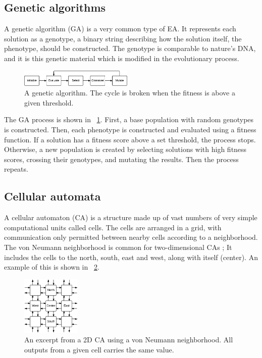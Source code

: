
\subsection{Genetic algorithms}

A genetic algorithm (GA) is a very common type of EA.
It represents each solution as a genotype, a binary string describing how the solution itself, the phenotype, should be constructed.
The genotype is comparable to nature's DNA, and it is this genetic material which is modified in the evolutionary process.

\begin{figure}[!ht]
    \centering
    \includegraphics[width=0.48\textwidth]{figures/ga}
    \caption{A genetic algorithm. The cycle is broken when the fitness is above a given threshold.}
    \label{fig:ga}
\end{figure}

The GA process is shown in \figurename~\ref{fig:ga}.
First, a base population with random genotypes is constructed.
Then, each phenotype is constructed and evaluated using a fitness function.
If a solution has a fitness score above a set threshold, the process stops.
Otherwise, a new population is created by selecting solutions with high fitness scores, crossing their genotypes, and mutating the results.
Then the process repeats.

\subsection{Cellular automata}


A cellular automaton (CA) is a structure made up of vast numbers of very simple computational units called cells.
The cells are arranged in a grid, with communication only permitted between nearby cells according to a neighborhood.
The von Neumann neighborhood is common for two-dimensional CAs \CN;
It includes the cells to the north, south, east and west, along with itself (center).
An example of this is shown in \figurename~\ref{fig:ca}.

\begin{figure}[!ht]
    \centering
    \includegraphics[width=0.25\textwidth]{figures/ca}
    \caption{An excerpt from a 2D CA using a von Neumann neighborhood. All outputs from a given cell carries the same value.}
    \label{fig:ca}
\end{figure}

